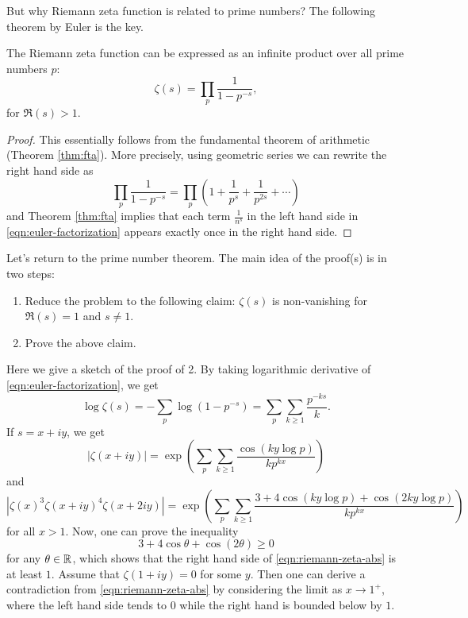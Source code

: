 But why Riemann zeta function is related to prime numbers?
The following theorem by Euler is the key.
\begin{theorem}
    \label{thm:euler-factorization}
    The Riemann zeta function can be expressed as an infinite product over all prime numbers $p$:
    \begin{equation}
        \zeta(s) = \prod_{p} \frac{1}{1 - p^{-s}},
        \label{eqn:euler-factorization}
    \end{equation}
    for $\Re(s) > 1$.
\end{theorem}
\begin{proof}
    This essentially follows from the fundamental theorem of arithmetic (Theorem \ref{thm:fta}).
    More precisely, using geometric series we can rewrite the right hand side as
    \[
    \prod_{p} \frac{1}{1 - p^{-s}} = \prod_{p} \left(1 + \frac{1}{p^s} + \frac{1}{p^{2s}} + \cdots \right)
    \]
    and Theorem \ref{thm:fta} implies that each term $\frac{1}{n^s}$ in the left hand side in \eqref{eqn:euler-factorization} appears exactly once in the right hand side.
\end{proof}

Let's return to the prime number theorem.
The main idea of the proof(s) is in two steps:
\begin{enumerate}
    \item Reduce the problem to the following claim: $\zeta(s)$ is non-vanishing for $\Re(s) = 1$ and $s \ne 1$.
    \item Prove the above claim.
\end{enumerate}

Here we give a sketch of the proof of 2.
By taking logarithmic derivative of \eqref{eqn:euler-factorization}, we get
\[
\log \zeta(s) = - \sum_p \log(1 - p^{-s}) = \sum_p \sum_{k \ge 1} \frac{p^{-ks}}{k}.
\]
If $s = x + iy$, we get
\[
|\zeta(x + iy)| = \exp\left(\sum_{p} \sum_{k \ge 1} \frac{\cos (ky \log p)}{k p^{kx}}\right)
\]
and
\begin{equation}
\label{eqn:riemann-zeta-abs}
|\zeta(x)^3 \zeta(x + iy)^4 \zeta(x + 2iy)| = \exp\left(\sum_{p} \sum_{k \ge 1} \frac{3 + 4 \cos(k y \log p) + \cos(2 k y \log p)}{k p^{kx}}\right)
\end{equation}
for all $x > 1$.
Now, one can prove the inequality
\begin{equation}
    \label{eqn:cosineq}
    3 + 4 \cos \theta + \cos(2\theta) \ge 0
\end{equation}
for any $\theta \in \mathbb{R}$, which shows that the right hand side of \eqref{eqn:riemann-zeta-abs} is at least $1$.
Assume that $\zeta(1 + iy) = 0$ for some $y$. Then one can derive a contradiction from \eqref{eqn:riemann-zeta-abs} by considering the limit as $x \to 1^+$, where the left hand side tends to $0$ while the right hand is bounded below by $1$.

